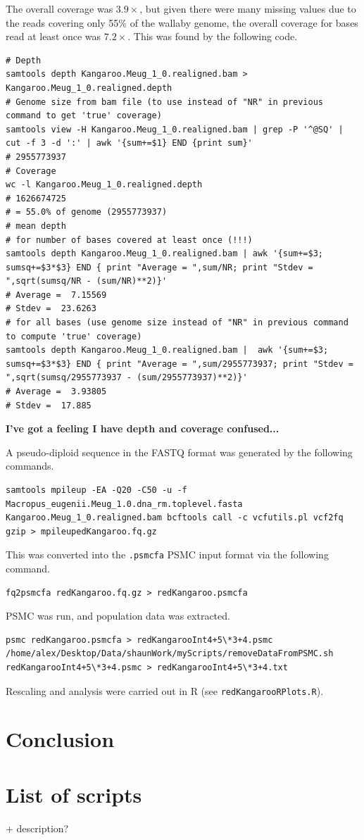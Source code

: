 \documentclass[11pt,a4paper]{article}
\begin{document}
The overall coverage was $3.9\times$, but given there were many missing values due to the reads covering only 55\% of the wallaby genome, the overall coverage for bases read at least once was $7.2\times$. This was found by the following code.
\begin{lstlisting}
# Depth
samtools depth Kangaroo.Meug_1_0.realigned.bam > Kangaroo.Meug_1_0.realigned.depth
# Genome size from bam file (to use instead of "NR" in previous command to get 'true' coverage)
samtools view -H Kangaroo.Meug_1_0.realigned.bam | grep -P '^@SQ' | cut -f 3 -d ':' | awk '{sum+=$1} END {print sum}'
# 2955773937
# Coverage
wc -l Kangaroo.Meug_1_0.realigned.depth
# 1626674725
# = 55.0% of genome (2955773937)
# mean depth
# for number of bases covered at least once (!!!)
samtools depth Kangaroo.Meug_1_0.realigned.bam | awk '{sum+=$3; sumsq+=$3*$3} END { print "Average = ",sum/NR; print "Stdev = ",sqrt(sumsq/NR - (sum/NR)**2)}'
# Average =  7.15569
# Stdev =  23.6263
# for all bases (use genome size instead of "NR" in previous command to compute 'true' coverage)
samtools depth Kangaroo.Meug_1_0.realigned.bam |  awk '{sum+=$3; sumsq+=$3*$3} END { print "Average = ",sum/2955773937; print "Stdev = ",sqrt(sumsq/2955773937 - (sum/2955773937)**2)}'
# Average =  3.93805
# Stdev =  17.885
\end{lstlisting}
\textbf{I've got a feeling I have depth and coverage confused...}


A pseudo-diploid sequence in the FASTQ format was generated by the following commands.
\begin{lstlisting}
samtools mpileup -EA -Q20 -C50 -u -f Macropus_eugenii.Meug_1.0.dna_rm.toplevel.fasta Kangaroo.Meug_1_0.realigned.bam bcftools call -c vcfutils.pl vcf2fq gzip > mpileupedKangaroo.fq.gz
\end{lstlisting}

This was converted into the \verb|.psmcfa| PSMC input format via the following command.
\begin{lstlisting}
fq2psmcfa redKangaroo.fq.gz > redKangaroo.psmcfa
\end{lstlisting}
PSMC was run, and population data was extracted.
\begin{lstlisting}
psmc redKangaroo.psmcfa > redKangarooInt4+5\*3+4.psmc
/home/alex/Desktop/Data/shaunWork/myScripts/removeDataFromPSMC.sh redKangarooInt4+5\*3+4.psmc > redKangarooInt4+5\*3+4.txt
\end{lstlisting}
Rescaling and analysis were carried out in R (see \verb|redKangarooRPlots.R|).


\section{Conclusion}


{}
\newpage

\appendix
\section{List of scripts}
+ description?
\end{document}
